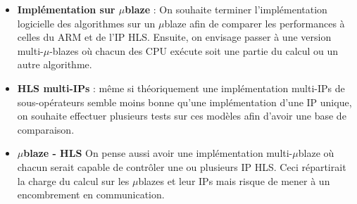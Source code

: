 \documentclass[12pt,a4paper]{article}
\begin{document}
\begin{itemize}
\item \textbf{Implémentation sur $\mu$blaze} : On souhaite terminer l'implémentation logicielle des algorithmes sur un $\mu$blaze afin de comparer les performances à celles du ARM et de l'IP HLS. Ensuite, on envisage passer à une version multi-$\mu$-blazes où chacun des CPU exécute soit une partie du calcul ou un autre algorithme.
\item \textbf{HLS multi-IPs} : même si théoriquement une implémentation multi-IPs de sous-opérateurs semble moins bonne qu'une implémentation d'une IP unique, on souhaite effectuer plusieurs tests sur ces modèles afin d'avoir une base de comparaison.
\item \textbf{$\mu$blaze - HLS} On pense aussi avoir une implémentation multi-$\mu$blaze où chacun serait capable de contrôler une ou plusieurs IP HLS. Ceci répartirait la charge du calcul sur les $\mu$blazes et leur IPs mais risque de mener à un encombrement en communication.
\end{itemize}
\end{document}
